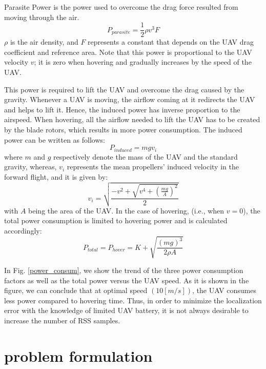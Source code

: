 \documentclass[journal,twocolumn]{IEEEtran}
\begin{document}
Parasite Power is the power used to overcome the drag force resulted from moving through the air.
\begin{equation}\label{parasite}
P_{parasite} = \frac{1}{2} {\rho{v}^3F}
\end{equation}
$\rho$ is the air density, and $F$ represents a constant that
depends on the UAV drag coefficient and reference area.
Note that this power is proportional to the UAV velocity $v$; it
is zero when hovering and gradually increases by the speed
of the UAV.

This power is required to lift the UAV and overcome the drag caused by the gravity. Whenever a UAV is moving, the airflow coming at it redirects the UAV and helps to lift it. Hence, the induced power has inverse proportion to the airspeed. When hovering, all the airflow needed to lift the UAV has to be created by the blade rotors, which results in more power consumption. The induced power can be written as follows:
\begin{equation}\label{induced}
P_{induced} = {m}{g}{v_i}
\end{equation}
where $m$ and $g$ respectively denote the mass of the UAV and the standard gravity, whereas, $v_i$ represents the mean propellers’ induced velocity in the forward flight, and it is given by:
\begin{equation}\label{v_i_power}
v_{i} = \sqrt{\frac{-{v^2}+\sqrt{v^4 + (\frac{mg}{A})^2}}{2}}
\end{equation}
with $A$ being the area of the UAV.
In the case of hovering, (i.e., when $v = 0$), the total power consumption is limited to hovering power and is calculated accordingly:
\begin{equation}\label{P_hover}
P_{total} = P_{hover} = K + \sqrt{\frac{(mg)^3}{2{\rho}A}}
\end{equation}

In Fig. \ref{power_consum}, we show the trend of the three power consumption factors as well as the total power versus the UAV speed. As it is shown in the figure, we can conclude that at optimal speed $(10 [m/s])$, the UAV consumes less power compared to hovering time. Thus, in order to minimize the localization error with the knowledge of limited UAV battery, it is not always desirable to increase the number of RSS samples.




\section{problem formulation}
\end{document}
